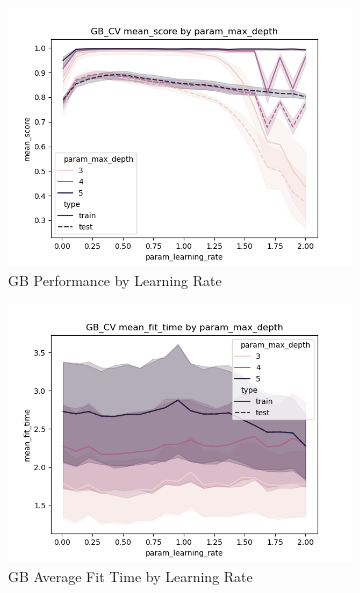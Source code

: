 \documentclass[12pt]{article}
\begin{document}
\begin{figure}
  \begin{subfigure}{.5\textwidth}
    \includegraphics[width=.95\textwidth]{../results5/gb_cv/param_max_depth_mean_score_param_learning_rate.png}
    \caption{GB Performance by Learning Rate}
    \end{subfigure}%
  \begin{subfigure}{.5\textwidth}
    \includegraphics[width=.95\textwidth]{../results5/gb_cv/param_max_depth_mean_fit_time_param_learning_rate.png}
    \caption{GB Average Fit Time by Learning Rate}
  \end{subfigure}
  \begin{subfigure}{.5\textwidth}

\end{subfigure}
\end{figure}
\end{document}
